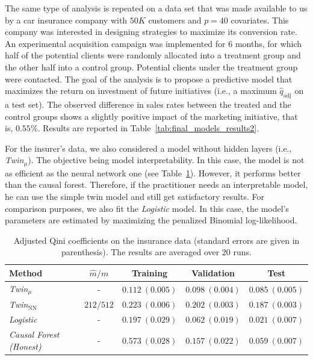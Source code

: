\documentclass{article}
\def\qadj{\hat{q}_{\mathrm{adj}}}
\begin{document}
The same type of analysis is repeated on a data set that was made available to us by a car insurance company with $50K$ customers and $p=40$ covariates. This company was interested in designing strategies to maximize its conversion rate. An experimental acquisition campaign was implemented for $6$ months, for which half of the potential clients were randomly allocated into a treatment group and the other half into a control group. Potential clients under the treatment group were contacted. The goal of the analysis is to propose a predictive model that maximizes the return on investment of future initiatives (i.e., a maximum $\qadj$ on a test set). The observed difference in sales rates between the treated and the control groups shows a slightly positive impact of the marketing initiative, that is, $0.55\%$. Results are reported in Table~\ref{tab:final_models_results2}.


For the insurer's data, we also considered a model without hidden layers (i.e., {\it Twin$_{\mu}$}). The objective being model interpretability. In this case, the model is not as efficient as the neural network one (see Table~\ref{tab:final_models_results}). However, it performs better than the causal forest. Therefore, if the practitioner needs an interpretable model, he can use the simple twin model and still get satisfactory results. For comparison purposes, we also fit the {\it Logistic} model. In this case, the model's parameters are estimated by maximizing the penalized Binomial log-likelihood. 

\begin{table}[!ht]
    \centering
    
    \begin{tabular}{lcccc}
        \hline
        Method & $\hat{m}/m$ &Training & Validation & Test \\
        \hline
        {\it Twin$_{\mu}$}  & - & $0.112~(0.005)$ & $0.098~(0.004)$ & $0.085~(0.005)$\\
        {\it Twin$_{\mathrm{NN}}$} & $212/512$ & $0.223~(0.006)$ & $0.202~(0.003)$ &  $0.187~(0.003)$\\
        \hline
        {\it Logistic} & - & $0.197~(0.029)$  & $0.062~(0.019)$ & $0.021~(0.007)$ \\
        {\it Causal Forest (Honest)} & - & $0.573~(0.028)$  & $0.157~(0.022)$ & $0.059~(0.007)$ \\
        \hline
    \end{tabular}
    \vspace{2mm}
    \caption{Adjusted Qini coefficients on the insurance data (standard errors are given in parenthesis). The results are averaged over $20$ runs.}
    \label{tab:final_models_results}
\end{table}
\end{document}
